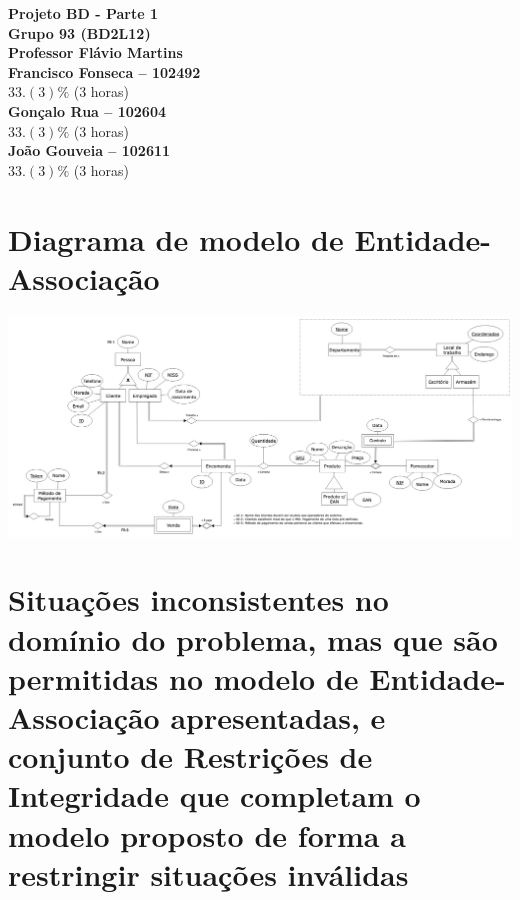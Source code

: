 \documentclass{article}
\begin{document}
\begin{titlepage}

    \begin{center}
        {\Huge\bfseries Projeto BD - Parte 1\\}
        \vspace{1cm}
        {\Large\bfseries Grupo 93 (BD2L12)}\\
        \vspace{0.1cm}
        {\Large\bfseries Professor Flávio Martins}\\
        \vspace{0.5cm}
        {\Large\bfseries Francisco Fonseca -- 102492}\\[5pt]
        $33.(3)\%$ (3 horas)\\[14pt]
        {\Large\bfseries Gonçalo Rua -- 102604}\\[5pt]
        $33.(3)\%$ (3 horas)\\[14pt]
        {\Large\bfseries João Gouveia -- 102611}\\[5pt]
        $33.(3)\%$ (3 horas)\\[14pt]
    \end{center}

\end{titlepage}

\section{Diagrama de modelo de Entidade-Associação}

\vspace{0.5cm}
\includegraphics[scale=0.2]{diagrama.png}
\vspace{0.5cm}

\section{Situações inconsistentes no domínio do problema, mas que são permitidas no modelo de Entidade-Associação apresentadas, e conjunto de Restrições de Integridade que completam o modelo proposto de forma a restringir situações inválidas}

\end{document}

